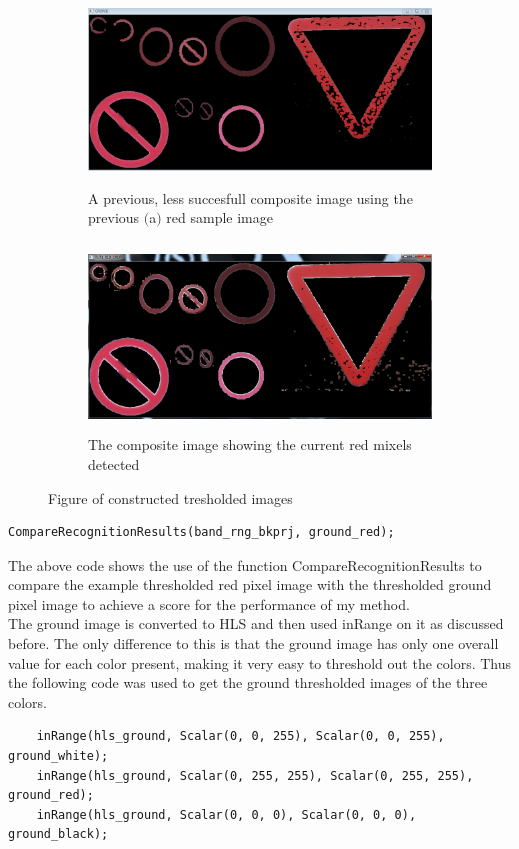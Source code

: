 \documentclass{article}
\begin{document}
\begin{figure}[H]
\begin{subfigure}{0.5\textwidth}
\includegraphics[width=0.9\linewidth, height=5cm]{CROPP.PNG} 
\caption{A previous, less succesfull composite image using the previous $($a$)$ red sample image}
\label{fig:subim1}
\end{subfigure}
\begin{subfigure}{0.5\textwidth}
\includegraphics[width=0.9\linewidth, height=5cm]{N_RED_CROP.PNG}
\caption{The composite image showing the current red mixels detected}
\label{fig:subim2}
\end{subfigure}
\caption{Figure of constructed tresholded images}
\label{fig:image2}
\end{figure}




\begin{lstlisting}
CompareRecognitionResults(band_rng_bkprj, ground_red);
\end{lstlisting}
The above code shows the use of the function CompareRecognitionResults to compare the example thresholded red pixel image with the thresholded ground pixel image to achieve a score for the performance of my method. \\
The ground image is converted to HLS and then used inRange on it as discussed before. The only difference to this is that the ground image has only one overall value for each color present, making it very easy to threshold out the colors. Thus the following code was used to get the ground thresholded images of the three colors.
\begin{lstlisting}
	inRange(hls_ground, Scalar(0, 0, 255), Scalar(0, 0, 255), ground_white);
	inRange(hls_ground, Scalar(0, 255, 255), Scalar(0, 255, 255), ground_red);
	inRange(hls_ground, Scalar(0, 0, 0), Scalar(0, 0, 0), ground_black);
\end{lstlisting}
\end{document}
